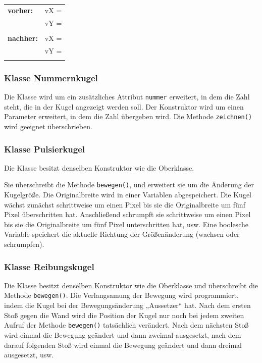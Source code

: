 \begin{minipage}{0.2\textwidth}
\begin{tabular}{ll}
\textbf{vorher:}  & vX = \\
                  & vY = \\
                  &      \\
\textbf{nachher:} & vX = \\
                  & vY = \\
                  &      \\
\end{tabular}
\end{minipage}
\hfill

\subsubsection{Klasse Nummernkugel}

Die Klasse  wird um ein zusätzliches Attribut
\verb|nummer| erweitert, in dem die Zahl steht, die in der Kugel angezeigt
werden soll. Der Konstruktor wird um einen Parameter erweitert, in dem die Zahl
übergeben wird. Die Methode \verb|zeichnen()| wird geeignet überschrieben.


\subsubsection{Klasse Pulsierkugel}

Die Klasse  besitzt denselben Konstruktor wie die
Oberklasse.

Sie überschreibt die Methode \verb|bewegen()|, und erweitert sie um die Änderung
der Kugelgröße. Die Originalbreite wird in einer Variablen abgespeichert. Die
Kugel wächst zunächst schrittweise um einen Pixel bis sie die Originalbreite um
fünf Pixel überschritten hat. Anschließend schrumpft sie schrittweise um einen
Pixel bis sie die Originalbreite um fünf Pixel unterschritten hat, usw. Eine
boolesche Variable speichert die aktuelle Richtung der Größenänderung (wachsen
oder schrumpfen).


\subsubsection{Klasse Reibungskugel}

Die Klasse  besitzt denselben Konstruktor wie die
Oberklasse und überschreibt die Methode \verb|bewegen()|. Die Verlangsamung
der Bewegung wird programmiert, indem die Kugel bei der Bewegungsänderung
„Aussetzer“ hat. Nach dem ersten Stoß gegen die Wand wird die Position der
Kugel nur noch bei jedem zweiten Aufruf der Methode \verb|bewegen()| tatsächlich
verändert. Nach dem nächsten Stoß wird einmal die Bewegung geändert und dann
zweimal ausgesetzt, nach dem darauf folgenden Stoß wird einmal die Bewegung
geändert und dann dreimal ausgesetzt, usw.

